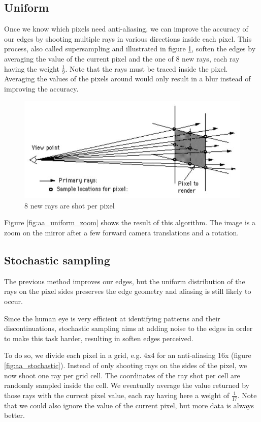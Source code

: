 \subsection{Uniform}
Once we know which pixels need anti-aliasing, we can improve the accuracy of our edges by shooting multiple rays in various directions inside each pixel. This process, also called supersampling and illustrated in figure \ref{fig:aa_uniform}, soften the edges by averaging the value of the current pixel and the one of 8 new rays, each ray having the weight $\frac{1}{9}$. Note that the rays must be traced inside the pixel. Averaging the values of the pixels around would only result in a blur instead of improving the accuracy.

\begin{figure}[H]
\centering
\includegraphics[width=0.5\linewidth]{img/antialiasing/uniform.jpg}
\caption{8 new rays are shot per pixel}
\label{fig:aa_uniform}
\end{figure}

Figure \ref{fig:aa_uniform_zoom} shows the result of this algorithm. The image is a zoom on the mirror after a few forward camera translations and a rotation.

\subsection{Stochastic sampling}
The previous method improves our edges, but the uniform distribution of the rays on the pixel sides preserves the edge geometry and aliasing is still likely to occur.

Since the human eye is very efficient at identifying patterns and their discontinuations, stochastic sampling aims at adding noise to the edges in order to make this task harder, resulting in soften edges perceived. 

To do so, we divide each pixel in a grid, e.g. 4x4 for an anti-aliasing 16x (figure \ref{fig:aa_stochastic}). Instead of only shooting rays on the sides of the pixel, we now shoot one ray per grid cell. The coordinates of the ray shot per cell are randomly sampled inside the cell. We eventually average the value returned by those rays with the current pixel value, each ray having here a weight of $\frac{1}{17}$. Note that we could also ignore the value of the current pixel, but more data is always better.

